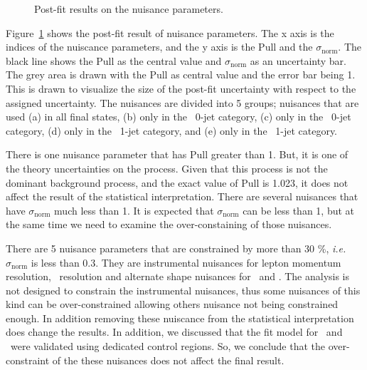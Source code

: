 \begin{figure}[!hbtp]
{}
\caption{Post-fit results on the nuisance parameters.}
\label{fig:postnuisance}
\end{figure}
Figure~\ref{fig:postnuisance} shows the post-fit result of nuisance parameters. 
The x axis is the indices of the nuiscance parameters, and the y axis is the 
Pull and the $\sigma_{\textrm{norm}}$. The black line shows the Pull 
as the central value and 
$\sigma_{\textrm{norm}}$ as an uncertainty bar. The grey area is drawn with the Pull as 
central value and the error bar being 1. This is drawn to visualize the size of 
the post-fit uncertainty with respect to the assigned uncertainty. 
The nuisances are divided into 5 groups; nuisances that are used (a) in all final states, 
(b) only in the \DF\ 0-jet category,  (c) only in the \SF\ 0-jet category,  
(d) only in the \DF\ 1-jet category,  and (e) only in the \SF\ 1-jet category. 

There is one nuisance parameter that has Pull greater than 1. 
But, it is one of the theory uncertainties on the \ggww process. 
Given that this process is not the dominant background process, 
and the exact value of Pull is 1.023, it does not affect the
result of the statistical interpretation.
There are several nuisances that have $\sigma_{\textrm{norm}}$ much 
less than 1. It is expected that $\sigma_{\textrm{norm}}$ can be less than 1, 
but at the same time we need to examine the over-constaining of 
those nuisances. 

There are 5 nuisance parameters that are constrained by more than 30 \%, 
\textit{i.e.} $\sigma_{\textrm{norm}}$ is less than 0.3. They are 
instrumental nuisances for lepton momentum resolution, \met\ resolution 
and alternate shape nuisances for \qqww\ and \topbkg.
The analysis is not designed to constrain the instrumental nuisances, 
thus some nuisances of this kind can be over-constrained allowing 
others nuisance not being constrained enough. In addition removing 
these nuiscance from the statistical interpretation does 
change the results. In addition, we discussed that the fit model 
for  \qqww\ and \topbkg\ were validated using dedicated control regions.  
So, we conclude that the over-constraint of the these nuisances does 
not affect the final result. 

